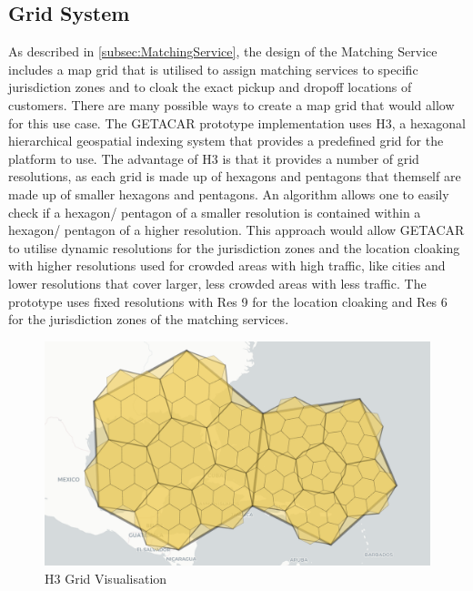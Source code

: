 \subsection{Grid System}
As described in \ref{subsec:MatchingService}, the design of the Matching Service includes a map grid that is utilised to assign matching services to specific jurisdiction zones and to cloak the exact pickup and dropoff locations of customers. There are many possible ways to create a map grid that would allow for this use case. The GETACAR prototype implementation uses H3, a hexagonal hierarchical geospatial indexing system that provides a predefined grid for the platform to use. The advantage of H3 is that it provides a number of grid resolutions, as each grid is made up of hexagons and pentagons that themself are made up of smaller hexagons and pentagons. An algorithm allows one to easily check if a hexagon/ pentagon of a smaller resolution is contained within a hexagon/ pentagon of a higher resolution. This approach would allow GETACAR to utilise dynamic resolutions for the  jurisdiction zones and the location cloaking with higher resolutions used for crowded areas with high traffic, like cities and lower resolutions that cover larger, less crowded  areas with less traffic. The prototype uses fixed resolutions with Res 9 for the location cloaking and Res 6 for the  jurisdiction zones of the matching services. 

\begin{figure}[h]
    \centering
    \includegraphics[width=\linewidth]{data/11.png}
    \caption{H3 Grid Visualisation}
    \label{fig:H3Visualisation}
\end{figure}

